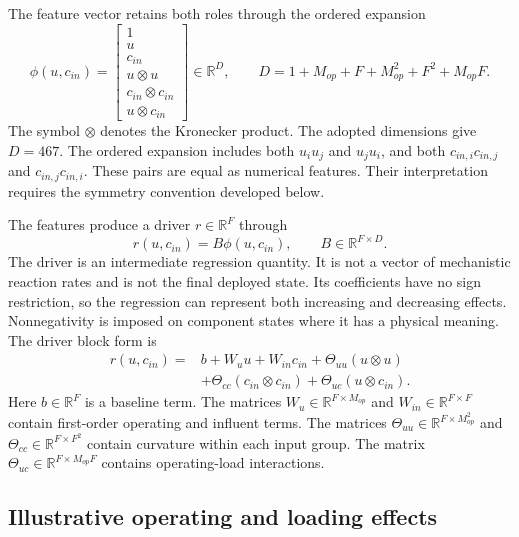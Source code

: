 The feature vector retains both roles through the ordered expansion
\begin{equation}
\label{eq:icsor_features}
\phi(u,c_{in})=
\begin{bmatrix}
1\\u\\c_{in}\\u\otimes u\\c_{in}\otimes c_{in}\\u\otimes c_{in}
\end{bmatrix}
\in\mathbb{R}^{D},
\qquad
D=1+M_{op}+F+M_{op}^{2}+F^{2}+M_{op}F.
\end{equation}
The symbol \(\otimes\) denotes the Kronecker product. The adopted dimensions give \(D=467\). The ordered expansion includes both \(u_i u_j\) and \(u_j u_i\), and both \(c_{in,i}c_{in,j}\) and \(c_{in,j}c_{in,i}\). These pairs are equal as numerical features. Their interpretation requires the symmetry convention developed below.

The features produce a driver \(r\in\mathbb{R}^{F}\) through
\begin{equation}
\label{eq:icsor_driver}
r(u,c_{in})=B\phi(u,c_{in}),
\qquad B\in\mathbb{R}^{F\times D}.
\end{equation}
The driver is an intermediate regression quantity. It is not a vector of mechanistic reaction rates and is not the final deployed state. Its coefficients have no sign restriction, so the regression can represent both increasing and decreasing effects. Nonnegativity is imposed on component states where it has a physical meaning. The driver block form is
\begin{equation}
\label{eq:icsor_driver_blocks}
\begin{aligned}
r(u,c_{in})={}&b+W_u u+W_{in}c_{in}
+\Theta_{uu}(u\otimes u)\\
&+\Theta_{cc}(c_{in}\otimes c_{in})
+\Theta_{uc}(u\otimes c_{in}).
\end{aligned}
\end{equation}
Here \(b\in\mathbb{R}^{F}\) is a baseline term. The matrices \(W_u\in\mathbb{R}^{F\times M_{op}}\) and \(W_{in}\in\mathbb{R}^{F\times F}\) contain first-order operating and influent terms. The matrices \(\Theta_{uu}\in\mathbb{R}^{F\times M_{op}^{2}}\) and \(\Theta_{cc}\in\mathbb{R}^{F\times F^{2}}\) contain curvature within each input group. The matrix \(\Theta_{uc}\in\mathbb{R}^{F\times M_{op}F}\) contains operating-load interactions.

\subsection{Illustrative operating and loading effects}

